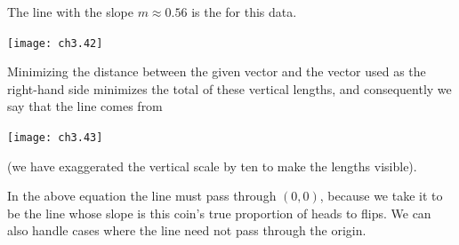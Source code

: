 The line with the slope \( m\approx 0.56 \)
is the %
for this data.
\begin{center}  \small
  \texttt{[image: ch3.42]}
\end{center}
Minimizing the distance
between the given vector and the vector used as the right-hand side
minimizes the total of these vertical lengths,
and consequently
we say that the line comes from
\begin{center}  \small
  \texttt{[image: ch3.43]}
\end{center}
(we have exaggerated the vertical scale by ten
to make the lengths visible).

In the above equation the line 
must pass through \( (0,0) \),
because we take it to be
the line whose slope is this coin's true proportion
of heads to flips. 
We can also handle cases where the line need not
pass through the origin.

